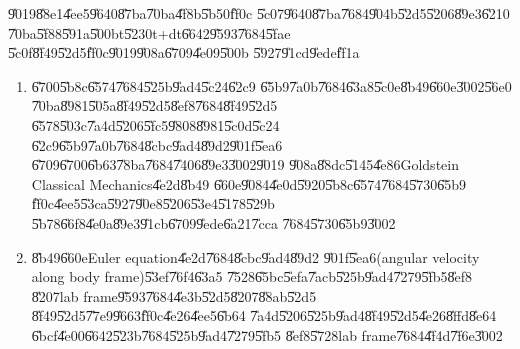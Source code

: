 \documentclass[12pt]{article}
\begin{document}
\U{9019}\U{88e1}\U{4ee5}\U{9640}\U{87ba}\U{70ba}\U{4f8b}\U{5b50}\U{ff0c}%
\U{5c07}\U{9640}\U{87ba}\U{7684}\U{904b}\U{52d5}\U{5206}\U{89e3}\U{6210}%
\U{70ba}\U{5f88}\U{591a}\U{500b}t\U{5230}t+dt\U{6642}\U{9593}\U{7684}\U{5fae}%
\U{5c0f}\U{8f49}\U{52d5}\U{ff0c}\U{9019}\U{908a}\U{6709}\U{4e09}\U{500b}%
\U{5927}\U{91cd}\U{9ede}\U{ff1a}

\begin{enumerate}
\item \U{6700}\U{5b8c}\U{6574}\U{7684}\U{525b}\U{9ad4}\U{5c24}\U{62c9}%
\U{65b9}\U{7a0b}\U{7684}\U{63a8}\U{5c0e}\U{8b49}\U{660e}\U{3002}\U{56e0}%
\U{70ba}\U{8981}\U{505a}\U{8f49}\U{52d5}\U{8ef8}\U{7684}\U{8f49}\U{52d5}%
\U{6578}\U{503c}\U{7a4d}\U{5206}\U{5fc5}\U{9808}\U{8981}\U{5c0d}\U{5c24}%
\U{62c9}\U{65b9}\U{7a0b}\U{7684}\U{8cbc}\U{9ad4}\U{89d2}\U{901f}\U{5ea6}%
\U{6709}\U{6700}\U{6b63}\U{78ba}\U{7684}\U{7406}\U{89e3}\U{3002}\U{9019}%
\U{908a}\U{88dc}\U{5145}\U{4e86}Goldstein Classical Mechanics\U{4e2d}\U{8b49}%
\U{660e}\U{9084}\U{4e0d}\U{5920}\U{5b8c}\U{6574}\U{7684}\U{5730}\U{65b9}%
\U{ff0c}\U{4ee5}\U{53ca}\U{5927}\U{90e8}\U{5206}\U{53e4}\U{5178}\U{529b}%
\U{5b78}\U{66f8}\U{4e0a}\U{89e3}\U{91cb}\U{6709}\U{9ede}\U{6a21}\U{7cca}%
\U{7684}\U{5730}\U{65b9}\U{3002}

\item \U{8b49}\U{660e}Euler equation\U{4e2d}\U{7684}\U{8cbc}\U{9ad4}\U{89d2}%
\U{901f}\U{5ea6}(angular velocity along body frame)\U{53ef}\U{76f4}\U{63a5}%
\U{7528}\U{65bc}\U{5efa}\U{7acb}\U{525b}\U{9ad4}\U{7279}\U{5fb5}\U{8ef8}%
\U{8207}lab frame\U{9593}\U{7684}\U{4e3b}\U{52d5}\U{8207}\U{88ab}\U{52d5}%
\U{8f49}\U{52d5}\U{77e9}\U{9663}\thinspace \U{ff0c}\U{4e26}\U{4ee5}\U{6b64}%
\U{7a4d}\U{5206}\U{525b}\U{9ad4}\U{8f49}\U{52d5}\U{4e26}\U{8ffd}\U{8e64}%
\U{6bcf}\U{4e00}\U{6642}\U{523b}\U{7684}\U{525b}\U{9ad4}\U{7279}\U{5fb5}%
\U{8ef8}\U{5728}lab frame\U{7684}\U{4f4d}\U{7f6e}\U{3002}


\end{enumerate}
\end{document}
